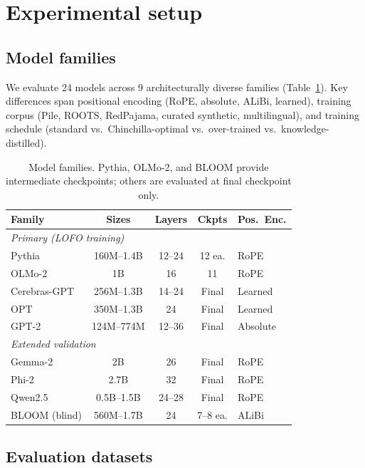 \documentclass{article}
\begin{document}
\section{Experimental setup}
\label{sec:setup}

\subsection{Model families}

We evaluate 24 models across 9 architecturally diverse families (Table~\ref{tab:families}). Key differences span positional encoding (RoPE, absolute, ALiBi, learned), training corpus (Pile, ROOTS, RedPajama, curated synthetic, multilingual), and training schedule (standard vs.\ Chinchilla-optimal vs.\ over-trained vs.\ knowledge-distilled).

\begin{table}[t]
\centering
\caption{Model families. Pythia, OLMo-2, and BLOOM provide intermediate checkpoints; others are evaluated at final checkpoint only.}
\label{tab:families}
\begin{tabular}{lcccl}
\toprule
Family & Sizes & Layers & Ckpts & Pos.\ Enc. \\
\midrule
\multicolumn{5}{l}{\emph{Primary (LOFO training)}} \\
Pythia & 160M--1.4B & 12--24 & 12 ea. & RoPE \\
OLMo-2 & 1B & 16 & 11 & RoPE \\
Cerebras-GPT & 256M--1.3B & 14--24 & Final & Learned \\
OPT & 350M--1.3B & 24 & Final & Learned \\
GPT-2 & 124M--774M & 12--36 & Final & Absolute \\
\midrule
\multicolumn{5}{l}{\emph{Extended validation}} \\
Gemma-2 & 2B & 26 & Final & RoPE \\
Phi-2 & 2.7B & 32 & Final & RoPE \\
Qwen2.5 & 0.5B--1.5B & 24--28 & Final & RoPE \\
\midrule
BLOOM (blind) & 560M--1.7B & 24 & 7--8 ea. & ALiBi \\
\bottomrule
\end{tabular}
\end{table}

\subsection{Evaluation datasets}
\end{document}
